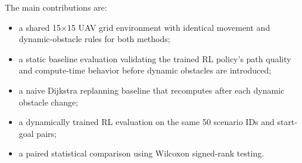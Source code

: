 The main contributions are:
\begin{itemize}
    \item a shared 15$\times$15 UAV grid environment with identical movement and dynamic-obstacle rules for both methods;
    \item a static baseline evaluation validating the trained RL policy's path quality and compute-time behavior before dynamic obstacles are introduced;
    \item a naive Dijkstra replanning baseline that recomputes after each dynamic obstacle change;
    \item a dynamically trained RL evaluation on the same 50 scenario IDs and start-goal pairs;
    \item a paired statistical comparison using Wilcoxon signed-rank testing.
\end{itemize}
